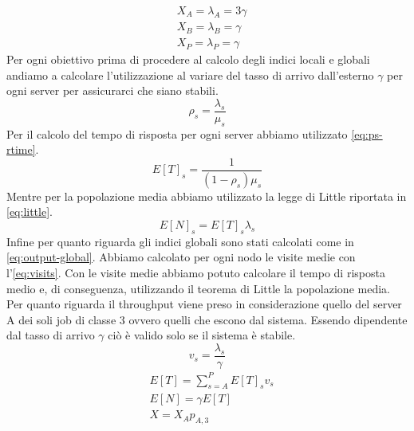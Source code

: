 \begin{equation}
  \begin{aligned}
    & \displaystyle {X}_{A} = {\lambda}_{A} = 3\gamma\\
    & \displaystyle {X}_{B} = {\lambda}_{B} = \gamma\\
    & \displaystyle {X}_{P} = {\lambda}_{P} = \gamma
  \end{aligned}
  \label{eq:flow-balance-solved}
\end{equation}
Per ogni obiettivo prima di procedere al calcolo degli indici locali e globali andiamo a calcolare l'utilizzazione al variare del tasso di arrivo dall'esterno $\gamma$ per ogni server per assicurarci che siano stabili.
\begin{equation}
\displaystyle {\rho}_{s} = \frac{{\lambda}_{s}}{\mu_{s}}
\end{equation}
Per il calcolo del tempo di risposta per ogni server abbiamo utilizzato \autoref{eq:ps-rtime}.
\begin{equation}
\displaystyle {E[T]}_{s} = \frac{1}{\left(1 - {\rho}_{s}\right) {\mu}_{s}}
\label{eq:ps-rtime}
\end{equation}
Mentre per la popolazione media abbiamo utilizzato la legge di Little riportata in \autoref{eq:little}.
\begin{equation}
    \displaystyle {E[N]}_{s} = {E[T]}_{s} {\lambda}_{s}
    \label{eq:little}
\end{equation}
Infine per quanto riguarda gli indici globali sono stati calcolati come in \autoref{eq:output-global}. Abbiamo calcolato per ogni nodo le visite medie con l'\autoref{eq:visits}. Con le visite medie abbiamo potuto calcolare il tempo di risposta medio e, di conseguenza, utilizzando il teorema di Little la popolazione media. Per quanto riguarda il throughput viene preso in considerazione quello del server A dei soli job di classe 3 ovvero quelli che escono dal sistema. Essendo dipendente dal tasso di arrivo $\gamma$ ciò è valido solo se il sistema è stabile.
\begin{equation}
    \displaystyle {v}_{s} = \frac{{\lambda}_{s}}{\gamma}
    \label{eq:visits}
\end{equation}
\begin{equation}
  \begin{aligned}
    & \displaystyle E[T] = \sum_{s=A}^{P} {E[T]}_{s} {v}_{s}\\
    & \displaystyle E[N] = \gamma E[T]\\
    & \displaystyle X = {X}_{A} {p}_{A,3}
  \end{aligned}
  \label{eq:output-global}
\end{equation}

